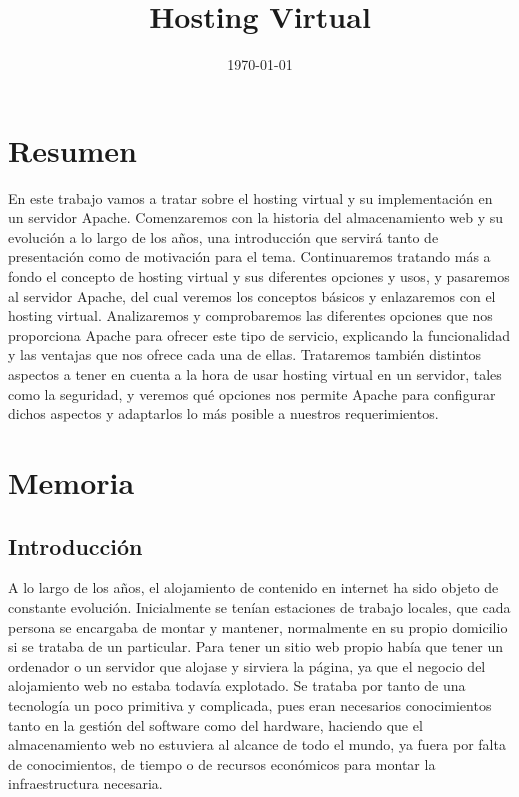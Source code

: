 \documentclass[a4paper, 10pt]{article} %
\title{\textbf{Hosting Virtual}} %
\date{\today} %
\begin{document}
\maketitle
\tableofcontents
\pagebreak

\section{Resumen}

En este trabajo vamos a tratar sobre el hosting virtual y su implementación en un servidor Apache. Comenzaremos con la historia del almacenamiento web y su evolución a lo largo de los años, una introducción que servirá tanto de presentación como de motivación para el tema. Continuaremos tratando más a fondo el concepto de hosting virtual y sus diferentes opciones y usos, y pasaremos al servidor Apache, del cual veremos los conceptos básicos y enlazaremos con el hosting virtual. Analizaremos y comprobaremos las diferentes opciones que nos proporciona Apache para ofrecer este tipo de servicio, explicando la funcionalidad y las ventajas que nos ofrece cada una de ellas. Trataremos también distintos aspectos a tener en cuenta a la hora de usar hosting virtual en un servidor, tales como la seguridad, y veremos qué opciones nos permite Apache para configurar dichos aspectos y adaptarlos lo más posible a nuestros requerimientos. 


\section{Memoria}

\subsection{Introducción}

A lo largo de los años, el alojamiento de contenido en internet ha sido objeto de constante evolución. Inicialmente se tenían estaciones de trabajo locales, que cada persona se encargaba de montar y mantener, normalmente en su propio domicilio si se trataba de un particular. Para tener un sitio web propio había que tener un ordenador o un servidor que alojase y sirviera la página, ya que el negocio del alojamiento web no estaba todavía explotado. Se trataba por tanto de una tecnología un poco primitiva y complicada, pues eran necesarios conocimientos tanto en la gestión del software como del hardware, haciendo que el almacenamiento web no estuviera al alcance de todo el mundo, ya fuera por falta de conocimientos, de tiempo o de recursos económicos para montar la infraestructura necesaria.
 
\end{document}
